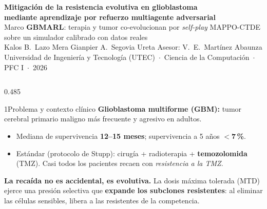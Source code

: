 \documentclass[final]{beamer}
\begin{document}
\begin{frame}[t]
\begin{tcolorbox}[enhanced, boxrule=0mm, arc=0mm,
  colback=uorange, colframe=uorange,
  borderline south={5mm}{0mm}{udark},
  left=12mm, right=12mm, top=9mm, bottom=9mm,
  drop fuzzy shadow=black!30]
\centering
{\bfseries\color{white}\huge Mitigación de la resistencia evolutiva en glioblastoma\\[1mm]
 mediante aprendizaje por refuerzo multiagente adversarial}\\[6mm]
{\large\color{white!92} Marco \textbf{GBMARL}: terapia y tumor co-evolucionan por \emph{self-play} MAPPO-CTDE sobre un simulador calibrado con datos reales}\\[7mm]
{\large\color{white!95} Kalos B.\ Lazo Mera \quad\textbullet\quad Gianpier A.\ Segovia Ureta \quad\textbullet\quad Asesor: V.\ E.\ Martínez Abaunza}\\[2mm]
{\color{white!85} Universidad de Ingeniería y Tecnología (UTEC) \,\(\cdot\)\, Ciencia de la Computación \,\(\cdot\)\, PFC I \,\(\cdot\)\, 2026}
\end{tcolorbox}

\vspace{5mm}

\begin{columns}[t]

\begin{column}{0.485\textwidth}

\begin{pblock}{1}{Problema y contexto clínico}
\textbf{\color{udark}Glioblastoma multiforme (GBM):} tumor cerebral primario maligno más frecuente y agresivo en adultos.
\begin{itemize}\itemsep2pt
  \item Mediana de supervivencia \textbf{12--15 meses}; supervivencia a 5 años \textbf{$<$7\,\%}.
  \item Estándar (protocolo de Stupp): cirugía + radioterapia + \textbf{temozolomida} (TMZ). Casi todos los pacientes recaen con \emph{resistencia a la TMZ}.
\end{itemize}

\textbf{\color{udark}La recaída no es accidental, es evolutiva.} La dosis máxima tolerada (MTD) ejerce una presión selectiva que \textbf{expande los subclones resistentes}: al eliminar las células sensibles, libera a las resistentes de la competencia.


\end{pblock}
\end{column}
\end{columns}
\end{frame}
\end{document}
